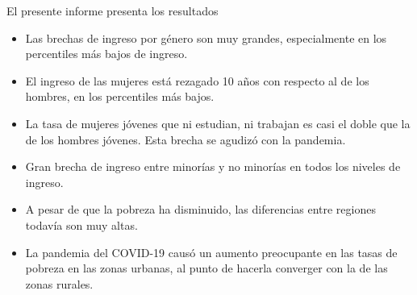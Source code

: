 

    El presente informe presenta los resultados
    
    \begin{tcolorbox}[enhanced,fit to height=10cm, colback=mycolor,colframe=mycolor,drop fuzzy shadow,watermark color=white,
                        title=Principales Resultados]
    
    \begin{itemize}
        \item Las brechas de ingreso por género son muy grandes, especialmente en los percentiles más bajos de ingreso.
        \item El ingreso de las mujeres está rezagado 10 años con respecto al de los hombres, en los percentiles más bajos.
        \item La tasa de mujeres jóvenes que ni estudian, ni trabajan es casi el doble que la de los hombres jóvenes. Esta brecha se agudizó con la pandemia.
         \item Gran brecha de ingreso entre minorías y no minorías  en todos los niveles de ingreso.
        \item A pesar de que la pobreza ha disminuido, las diferencias entre regiones todavía son muy altas.
        \item La pandemia del COVID-19 causó un aumento preocupante en las tasas de pobreza en las zonas urbanas, al punto de hacerla converger con la de las zonas  rurales.
     \end{itemize}
     
     
    \end{tcolorbox}





